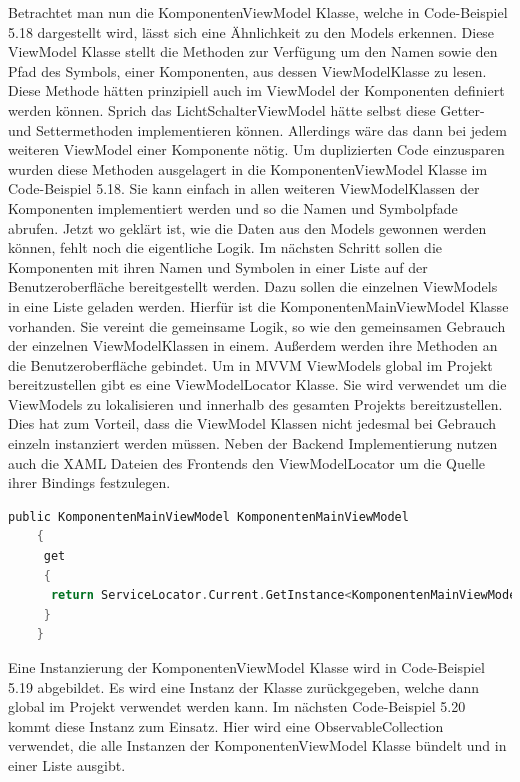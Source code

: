 Betrachtet man nun die KomponentenViewModel Klasse, welche in Code-Beispiel 5.18 dargestellt wird, lässt sich eine Ähnlichkeit zu den Models erkennen. Diese ViewModel Klasse stellt die Methoden zur Verfügung um den Namen sowie den Pfad des Symbols, einer Komponenten, aus dessen ViewModelKlasse zu lesen. Diese Methode hätten prinzipiell auch im ViewModel der Komponenten definiert werden können. Sprich das LichtSchalterViewModel hätte selbst diese Getter- und Settermethoden implementieren können. Allerdings wäre das dann bei jedem weiteren ViewModel einer Komponente nötig. Um duplizierten Code einzusparen wurden diese Methoden ausgelagert in die KomponentenViewModel Klasse im Code-Beispiel 5.18. Sie kann einfach in allen weiteren ViewModelKlassen der Komponenten implementiert werden und so die Namen und Symbolpfade abrufen.  
\linebreak
\linebreak
Jetzt wo geklärt ist, wie die Daten aus den Models gewonnen werden können, fehlt noch die eigentliche Logik. Im nächsten Schritt sollen die Komponenten mit ihren Namen und Symbolen in einer Liste auf der Benutzeroberfläche bereitgestellt werden. Dazu sollen die einzelnen ViewModels in eine Liste geladen werden. Hierfür ist die KomponentenMainViewModel Klasse vorhanden. Sie vereint die gemeinsame Logik, so wie den gemeinsamen Gebrauch der einzelnen ViewModelKlassen in einem. Außerdem werden ihre Methoden an die Benutzeroberfläche gebindet. Um in MVVM ViewModels global im Projekt bereitzustellen gibt es eine ViewModelLocator Klasse. Sie wird verwendet um die ViewModels zu lokalisieren und innerhalb des gesamten Projekts bereitzustellen. Dies hat zum Vorteil, dass die ViewModel Klassen nicht jedesmal bei Gebrauch einzeln instanziert werden müssen. Neben der Backend Implementierung nutzen auch die XAML Dateien des Frontends den ViewModelLocator um die Quelle ihrer Bindings festzulegen.
\begin{lstlisting}[language=C,
    frame=single,           % Ein Rahmen um den Code
    framexleftmargin=15pt,  % Rahmen link von den Zahlen
    style=algoBericht,
    label={viewModelLocator},
    captionpos=b,           % Caption unter den Code setzen
    caption={viewModelLocator}]
    public KomponentenMainViewModel KomponentenMainViewModel
    {
     get
     {
      return ServiceLocator.Current.GetInstance<KomponentenMainViewModel>();
     }
    }
\end{lstlisting}
Eine Instanzierung der KomponentenViewModel Klasse wird in Code-Beispiel 5.19 abgebildet. Es wird eine Instanz der Klasse zurückgegeben, welche dann global im Projekt verwendet werden kann. Im nächsten Code-Beispiel 5.20 kommt diese Instanz zum Einsatz. Hier wird eine ObservableCollection verwendet, die alle Instanzen der KomponentenViewModel Klasse bündelt und in einer Liste ausgibt. 
